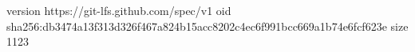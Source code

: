 version https://git-lfs.github.com/spec/v1
oid sha256:db3474a13f313d326f467a824b15acc8202c4ec6f991bcc669a1b74e6fcf623e
size 1123
